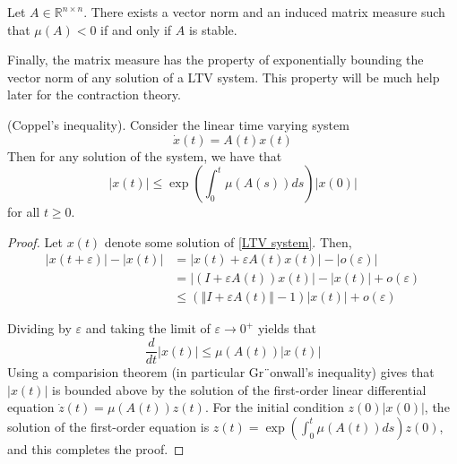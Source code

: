 \documentclass[12pt,English]{article}
\begin{document}

\begin{lem}
Let $A\in\mathbb{R}^{n\times n}$. There exists a vector norm and an induced matrix measure such that $\mu\left(A\right)<0$ if and only if $A$ is stable. 
\end{lem}



Finally, the matrix measure has the property of exponentially bounding the vector norm of any solution of a LTV system. This property will be much help later for the contraction theory.
\begin{lem}(Coppel's inequality)\label{Coppel's inequality}.
Consider the linear time varying system
\begin{equation}
    \Dot{x}\left(t\right)=A\left(t\right)x\left(t\right)
\end{equation}
Then for any solution of the system, we have that
\begin{equation}\label{LTV system}
    \left|x\left(t\right)\right|\leq\exp{\left(\int_0^t\mu\left(A\left(s\right)\right)ds\right)\left|x\left(0\right)\right|}
\end{equation}
for all $t\geq0$.
\end{lem}

\begin{proof}
Let $x\left(t\right)$ denote some solution of \ref{LTV system}. Then,
\begin{align*}
    \left|x\left(t+\varepsilon\right)\right|- \left|x\left(t\right)\right|&= \left|x\left(t\right)+\varepsilon A\left(t\right)x\left(t\right)\right|- \left|o\left(\varepsilon\right)\right|
    \\&= \left|\left(I+\varepsilon A\left(t\right)\right)x\left(t\right)\right|- \left|x\left(t\right)\right|+ o\left(\varepsilon\right)
    \\&\leq  \left(\left\Vert I+\varepsilon A\left(t\right)\right\Vert-1\right) \left|x\left(t\right)\right|+o\left(\varepsilon\right)
\end{align*}

Dividing by $\varepsilon$ and taking the limit of $\varepsilon\rightarrow0^{+}$
yields that
\[
\frac{d}{dt}\left|x\left(t\right)\right|\leq\mu\left(A\left(t\right)\right)\left|x\left(t\right)\right|
\]
Using a comparision theorem (in particular Gr¨onwall’s inequality) gives that $\left|x\left(t\right)\right|$ is bounded above by the solution of the first-order linear differential equation $\dot{z}\left(t\right)=\mu\left(A\left(t\right)\right)z\left(t\right)$. For the initial condition $z\left(0\right)\left|x\left(0\right)\right|$, the solution of the first-order equation is $z\left(t\right)=\exp\left(\int_{0}^{t}\mu\left(A\left(t\right)\right)ds\right)z\left(0\right)$, and this completes the proof.


\end{proof}
\end{document}

